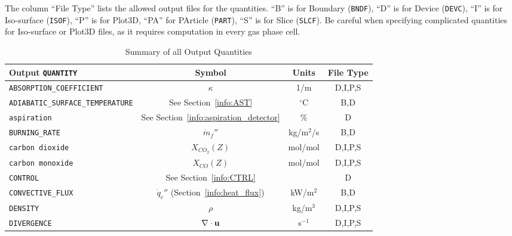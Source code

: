 \documentclass[11pt]{book}
\newcommand{\ct}{\tt\small}
\newcommand{\bu}{{\bf u}}
\newcommand{\dq}{\dot{q}}
\newcommand{\dm}{\dot{m}}
\begin{document}
The column ``File Type'' lists the allowed output files for the quantities. ``B'' is for Boundary ({\ct BNDF}),
``D'' is for Device ({\ct DEVC}), ``I'' is for Iso-surface ({\ct ISOF}), ``P'' is for Plot3D, ``PA'' for PArticle ({\ct PART}),
``S'' is for Slice ({\ct SLCF}). Be careful
when specifying complicated quantities for Iso-surface or Plot3D files, as it requires computation in every gas phase cell.

\begin{table}[h!]
\begin{center}
\caption{Summary of all Output Quantities}
\label{tab:output}
\begin{tabular}{|l|c|c|c|}
\hline
Output {\ct QUANTITY}                           & Symbol                                        & Units          & File Type    \\ \hline \hline
{\ct ABSORPTION\_COEFFICIENT}                   & $\kappa$                                      & 1/m            & D,I,P,S      \\ \hline
{\ct ADIABATIC\_SURFACE\_TEMPERATURE}           & See Section~\ref{info:AST}                    & $^\circ$C      & B,D          \\ \hline
{\ct aspiration}                                & See Section~\ref{info:aspiration_detector}    & \%             & D            \\ \hline
{\ct BURNING\_RATE}                             & $\dm_f''$                                     & kg/m$^2$/s     & B,D          \\ \hline
{\ct carbon dioxide}                            & $X_{CO_2}(Z)$                                 & mol/mol        & D,I,P,S      \\ \hline
{\ct carbon monoxide}                           & $X_{CO}(Z)$                                   & mol/mol        & D,I,P,S      \\ \hline
{\ct CONTROL}                                   & See Section~\ref{info:CTRL}                   &                & D            \\ \hline
{\ct CONVECTIVE\_FLUX}                          & $\dq_c''$ (Section~\ref{info:heat_flux})      & kW/m$^2$       & B,D          \\ \hline
{\ct DENSITY}                                   & $\rho$                                        & kg/m$^3$       & D,I,P,S      \\ \hline
{\ct DIVERGENCE}                                & $\nabla \cdot \bu$                            & s$^{-1}$       & D,I,P,S      \\ \hline

\end{tabular}
\end{center}
\end{table}
\end{document}
